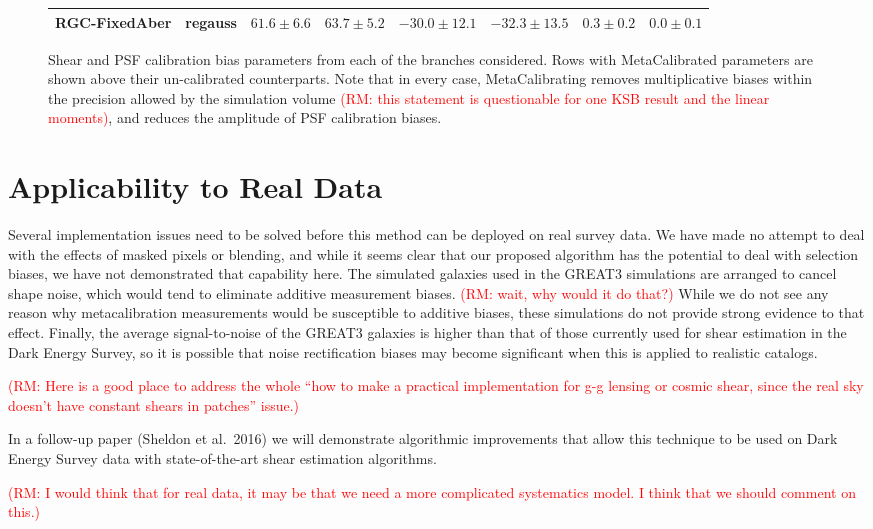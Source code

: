 \documentclass[iop]{emulateapj}
\newcommand\rmcomment[1]{\textcolor{red}{(RM: #1)}}
\begin{document}
\begin{figure}
{\begin{tabular}{l  c |cc | cc |cc }
RGC-FixedAber  & regauss  &  $61.6\pm6.6$ & $63.7\pm5.2$  & $-30.0\pm12.1$ & $-32.3\pm13.5$ &  $0.3\pm0.2$ & $0.0\pm0.1$ \\
\hline
\end{tabular}
}
\caption{Shear and PSF calibration bias parameters from each of the
  branches considered. Rows with MetaCalibrated parameters are shown
  above their un-calibrated counterparts. Note that in every case,
  MetaCalibrating removes multiplicative biases within the precision
  allowed by the simulation volume \rmcomment{this statement is questionable for one KSB result and
    the linear moments}, and reduces the amplitude of PSF
  calibration biases.}
\label{table:results}
\end{figure}

\section{Applicability to Real Data}
Several implementation issues need to be solved before this method can
be deployed on real survey data. We have made no attempt to deal with
the effects of masked pixels or blending, and while it seems clear
that our proposed algorithm has the potential to deal with selection
biases, we have not demonstrated that capability here.  The simulated
galaxies used in the GREAT3 simulations are arranged to cancel shape
noise, which would tend to eliminate additive measurement
biases. \rmcomment{wait, why would it do that?} While we do not see any reason why metacalibration
measurements would be susceptible to additive biases, these
simulations do not provide strong evidence to that effect. Finally,
the average signal-to-noise of the GREAT3 galaxies is higher than that
of those currently used for shear estimation in the Dark Energy
Survey, so it is possible that noise rectification biases may become
significant when this is applied to realistic catalogs.

\rmcomment{Here is a good place to address the whole ``how to make a practical implementation for
  g-g lensing or cosmic shear, since the real sky doesn't have constant shears in patches'' issue.}

In a follow-up paper (Sheldon et al.\ 2016) we will demonstrate
algorithmic improvements that allow this technique to be used on Dark
Energy Survey data with state-of-the-art shear estimation algorithms.

\rmcomment{I would think that for real data, it may be that we need a more complicated systematics
  model.  I think that we should comment on this.}
\end{document}
